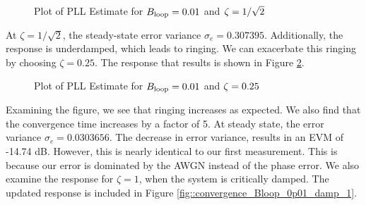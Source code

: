 \documentclass{article}
\begin{document}
\begin{figure}[H]
	\centerline{}
	\caption{Plot of PLL Estimate for $\protect{B_\text{loop}} = 0.01$ and $\protect{\zeta = 1/\sqrt{2}}$}
	\label{fig::convergence_Bloop_0p01_damp_sqrt_2}
\end{figure}

\noindent At $\zeta = 1/\sqrt{2}$, the steady-state error variance $\sigma_e=0.307395$. Additionally, the response is underdamped, which leads to ringing. We can exacerbate this ringing by choosing $\zeta=0.25$. The response that results is shown in Figure \ref{fig::convergence_Bloop_0p01_damp_0p25}.

\begin{figure}[H]
	\centerline{}
	\caption{Plot of PLL Estimate for $\protect{B_\text{loop}} = 0.01$ and $\protect{\zeta = 0.25}$}
	\label{fig::convergence_Bloop_0p01_damp_0p25}
\end{figure}

\noindent Examining the figure, we see that ringing increases as expected. We also find that the convergence time increases by a factor of 5. At steady state, the error variance $\sigma_e=0.0303656$. The decrease in error variance, results in an EVM of -14.74 dB. However, this is nearly identical to our first measurement. This is because our error is dominated by the AWGN instead of the phase error. We also examine the response for $\zeta = 1$, when the system is critically damped. The updated response is included in Figure \ref{fig::convergence_Bloop_0p01_damp_1}.
\end{document}
